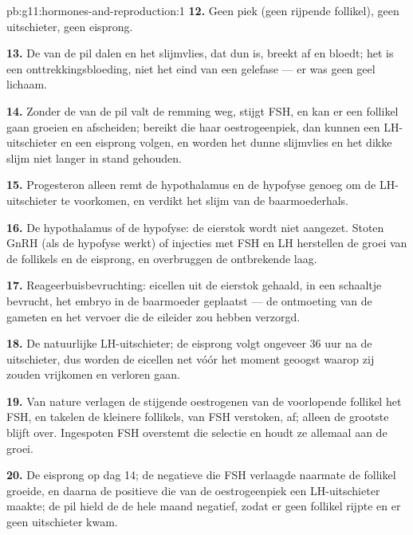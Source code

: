 \begin{solution}{pb:g11:hormones-and-reproduction:1}
\textbf{12.} Geen piek (geen rijpende follikel), geen uitschieter, geen eisprong.

\textbf{13.} De  van de pil dalen en het slijmvlies, dat dun is,
breekt af en bloedt; het is een onttrekkingsbloeding, niet het eind van
een gelefase --- er was geen geel lichaam.

\textbf{14.} Zonder de  van de pil valt de remming weg, stijgt
FSH, en kan er een follikel gaan groeien en afscheiden; bereikt die haar
oestrogeenpiek, dan kunnen een LH-uitschieter en een eisprong volgen, en
worden het dunne slijmvlies en het dikke slijm niet langer in stand
gehouden.

\textbf{15.} Progesteron alleen remt de hypothalamus en de hypofyse genoeg
om de LH-uitschieter te voorkomen, en verdikt het slijm van de
baarmoederhals.

\textbf{16.} De hypothalamus of de hypofyse: de eierstok wordt niet
aangezet. Stoten GnRH (als de hypofyse werkt) of injecties met FSH en LH
herstellen de groei van de follikels en de eisprong, en overbruggen de
ontbrekende laag.

\textbf{17.} Reageerbuisbevruchting: eicellen uit de eierstok gehaald, in
een schaaltje bevrucht, het embryo in de baarmoeder geplaatst --- de
ontmoeting van de gameten en het vervoer die de eileider zou hebben
verzorgd.

\textbf{18.} De natuurlijke LH-uitschieter; de eisprong volgt ongeveer 36
uur na de uitschieter, dus worden de eicellen net vóór het moment
geoogst waarop zij zouden vrijkomen en verloren gaan.

\textbf{19.} Van nature verlagen de stijgende oestrogenen van de
voorlopende follikel het FSH, en takelen de kleinere follikels, van FSH
verstoken, af; alleen de grootste blijft over. Ingespoten FSH overstemt
die selectie en houdt ze allemaal aan de groei.

\textbf{20.} De eisprong op dag 14; de negatieve  die FSH
verlaagde naarmate de follikel groeide, en daarna de positieve
 die van de oestrogeenpiek een LH-uitschieter maakte; de pil
hield de  de hele maand negatief, zodat er geen follikel
rijpte en er geen uitschieter kwam.
\end{solution}
